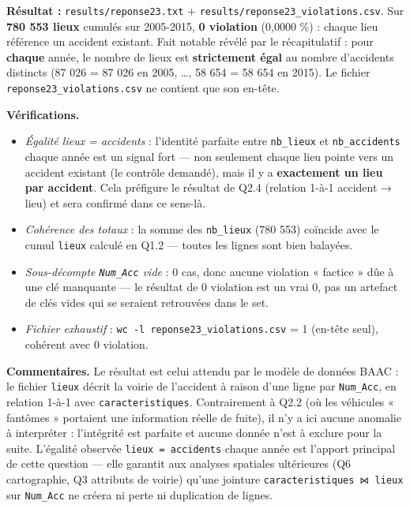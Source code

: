 \documentclass[11pt,a4paper]{article}
\newcommand{\rub}[2]{\textbf{\textcolor{#1}{#2}}}
\begin{document}
\rub{labresultat}{Résultat :} \texttt{results/reponse23.txt} + \texttt{results/reponse23\_violations.csv}. Sur \textbf{780 553 lieux} cumulés sur 2005-2015, \textbf{0 violation} (0,0000 \%) : chaque lieu référence un accident existant. Fait notable révélé par le récapitulatif : pour \textbf{chaque} année, le nombre de lieux est \textbf{strictement égal} au nombre d'accidents distincts (87 026 = 87 026 en 2005, …, 58 654 = 58 654 en 2015). Le fichier \texttt{reponse23\_violations.csv} ne contient que son en-tête.

\rub{labanalyse}{Vérifications.}

\begin{itemize}
\item \emph{Égalité lieux = accidents} : l'identité parfaite entre \texttt{nb\_lieux} et \texttt{nb\_accidents} chaque année est un signal fort — non seulement chaque lieu pointe vers un accident existant (le contrôle demandé), mais il y a \textbf{exactement un lieu par accident}. Cela préfigure le résultat de Q2.4 (relation 1-à-1 accident → lieu) et sera confirmé dans ce sens-là.
\item \emph{Cohérence des totaux} : la somme des \texttt{nb\_lieux} (780 553) coïncide avec le cumul \texttt{lieux} calculé en Q1.2 — toutes les lignes sont bien balayées.
\item \emph{Sous-décompte \texttt{Num\_Acc} vide} : 0 cas, donc aucune violation « factice » dûe à une clé manquante — le résultat de 0 violation est un vrai 0, pas un artefact de clés vides qui se seraient retrouvées dans le set.
\item \emph{Fichier exhaustif} : \texttt{wc -l reponse23\_violations.csv} = 1 (en-tête seul), cohérent avec 0 violation.
\end{itemize}

\rub{labcomment}{Commentaires.} Le résultat est celui attendu par le modèle de données BAAC : le fichier \texttt{lieux} décrit la voirie de l'accident à raison d'une ligne par \texttt{Num\_Acc}, en relation 1-à-1 avec \texttt{caracteristiques}. Contrairement à Q2.2 (où les véhicules « fantômes » portaient une information réelle de fuite), il n'y a ici aucune anomalie à interpréter : l'intégrité est parfaite et aucune donnée n'est à exclure pour la suite. L'égalité observée \texttt{lieux = accidents} chaque année est l'apport principal de cette question — elle garantit aux analyses spatiales ultérieures (Q6 cartographie, Q3 attributs de voirie) qu'une jointure \texttt{caracteristiques ⋈ lieux} sur \texttt{Num\_Acc} ne créera ni perte ni duplication de lignes.
\end{document}
